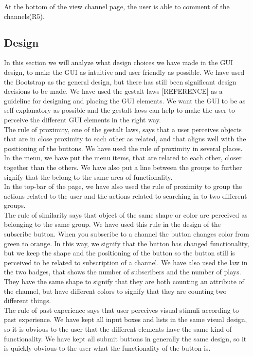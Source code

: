 \documentclass[a4paper,11pt,report]{article}
\begin{document}
{At the bottom of the view channel page, the user is able to comment of the channels(R5). \\

\subsection{Design}
In this section we will analyze what design choices we have made in the GUI design, to make the GUI as intuitive and user friendly as possible. We have used the Bootstrap as the general design, but there has still been significant design decisions to be made. We have used the gestalt laws [REFERENCE] as a guideline for designing and placing the GUI elements. We want the GUI to be as self explanatory as possible and the gestalt laws can help to make the user to perceive the different GUI elements in the right way. \\

The rule of proximity, one of the gestalt laws, says that a user perceives objects that are in close proximity to each other as related, and that aligns well with the positioning of the buttons. We have used the rule of proximity in several places. In the menu, we have put the menu items, that are related to each other, closer together than the others. We have also put a line between the groups to further signify that the belong to the same area of functionality. \\

In the top-bar of the page, we have also used the rule of proximity to group the actions related to the user and the actions related to searching in to two different groups. \\

The rule of similarity says that object of the same shape or color are perceived as belonging to the same group. We have used this rule in the design of the subscribe button. When you subscribe to a channel the button changes color from green to orange. In this way, we signify that the button has changed functionality, but we keep the shape and the positioning of the button so the button still is perceived to be related to subscription of a channel. We have also used the law in the two badges, that shows the number of subscribers and the number of plays. They have the same shape to signify that they are both counting an attribute of the channel, but have different colors to signify that they are counting two different things. \\

The rule of past experience says that user perceives visual stimuli according to past experience. We have kept all input boxes and lists in the same visual design, so it is obvious to the user that the different elements have the same kind of functionality. We have kept all submit buttons in generally the same design, so it is quickly obvious to the user what the functionality of the button is. \\ 

}
\end{document}
